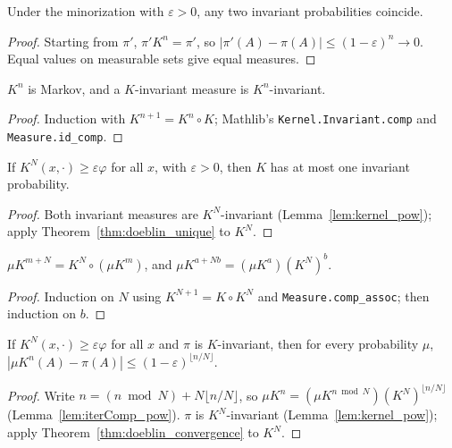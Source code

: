 \begin{theorem}
\label{thm:doeblin_unique}
\leanok
Under the minorization with $\varepsilon > 0$, any two invariant probabilities coincide.
\end{theorem}
\begin{proof}
\leanok
{}
Starting from $\pi'$, $\pi' K^n = \pi'$, so $|\pi'(A) - \pi(A)| \le (1-\varepsilon)^n \to 0$. Equal values on
measurable sets give equal measures.
\end{proof}

\begin{lemma}
\label{lem:kernel_pow}
\leanok
$K^n$ is Markov, and a $K$-invariant measure is $K^n$-invariant.
\end{lemma}
\begin{proof}
\leanok
Induction with $K^{n+1} = K^n \circ K$; Mathlib's \texttt{Kernel.Invariant.comp} and
\texttt{Measure.id\_comp}.
\end{proof}

\begin{theorem}
\label{thm:unique_invariant_of_pow}
\leanok
If $K^N(x,\cdot) \ge \varepsilon\varphi$ for all $x$, with $\varepsilon>0$, then $K$ has at most one invariant
probability.
\end{theorem}
\begin{proof}
\leanok
{}
Both invariant measures are $K^N$-invariant (Lemma~\ref{lem:kernel_pow}); apply
Theorem~\ref{thm:doeblin_unique} to $K^N$.
\end{proof}

\begin{lemma}
\label{lem:iterComp_pow}
\leanok
{}
$\mu K^{m+N} = K^N\circ(\mu K^m)$, and $\mu K^{a + Nb} = (\mu K^a)(K^N)^b$.
\end{lemma}
\begin{proof}
\leanok
Induction on $N$ using $K^{N+1} = K\circ K^N$ and \texttt{Measure.comp\_assoc}; then induction on $b$.
\end{proof}

\begin{theorem}
\label{thm:doeblin_convergence_pow}
\leanok
If $K^N(x,\cdot)\ge\varepsilon\varphi$ for all $x$ and $\pi$ is $K$-invariant, then for every probability $\mu$,
$|\mu K^n(A) - \pi(A)| \le (1-\varepsilon)^{\lfloor n/N\rfloor}$.
\end{theorem}
\begin{proof}
\leanok
{}
Write $n = (n \bmod N) + N\lfloor n/N\rfloor$, so $\mu K^n = (\mu K^{n\bmod N})(K^N)^{\lfloor n/N\rfloor}$
(Lemma~\ref{lem:iterComp_pow}). $\pi$ is $K^N$-invariant (Lemma~\ref{lem:kernel_pow}); apply
Theorem~\ref{thm:doeblin_convergence} to $K^N$.
\end{proof}

